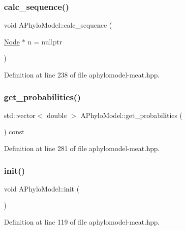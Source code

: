 \subsubsection{\texorpdfstring{calc\+\_\+sequence()}{calc\_sequence()}}
{\footnotesize\ttfamily void A\+Phylo\+Model\+::calc\+\_\+sequence (\begin{DoxyParamCaption}\item[{\hyperlink{class_node}{Node} $\ast$}]{n = {\ttfamily nullptr} }\end{DoxyParamCaption})}



Definition at line 238 of file aphylomodel-\/meat.\+hpp.

\mbox{\label{class_a_phylo_model_a3368d03919454f68f0cb5bd888f983a1}} 
\subsubsection{\texorpdfstring{get\+\_\+probabilities()}{get\_probabilities()}}
{\footnotesize\ttfamily std\+::vector$<$ double $>$ A\+Phylo\+Model\+::get\+\_\+probabilities (\begin{DoxyParamCaption}{ }\end{DoxyParamCaption}) const}



Definition at line 281 of file aphylomodel-\/meat.\+hpp.

\mbox{\label{class_a_phylo_model_a45a7af583f9619bce5d88b15303a73e6}} 
\subsubsection{\texorpdfstring{init()}{init()}}
{\footnotesize\ttfamily void A\+Phylo\+Model\+::init (\begin{DoxyParamCaption}{ }\end{DoxyParamCaption})}



Definition at line 119 of file aphylomodel-\/meat.\+hpp.

\mbox{\label{class_a_phylo_model_a66fced3b89fe385862318621855fa605}} 
